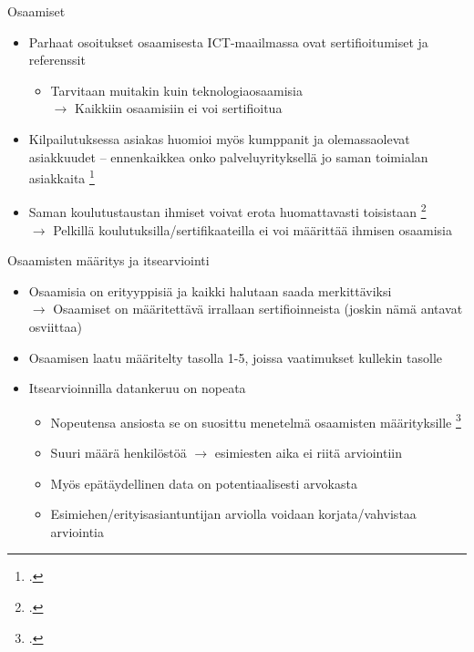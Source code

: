 \documentclass[first=purple,second=dblue,logo=redquo]{aaltoslides}
\begin{document}
\begin{frame}{Osaamiset}
\begin{itemize}
\item Parhaat osoitukset osaamisesta ICT-maailmassa ovat sertifioitumiset ja referenssit
\begin{itemize}
\item Tarvitaan muitakin kuin teknologiaosaamisia \\ $\rightarrow$ Kaikkiin osaamisiin ei voi sertifioitua
\end{itemize}
\item Kilpailutuksessa asiakas huomioi myös kumppanit ja olemassaolevat asiakkuudet -- ennenkaikkea onko palveluyrityksellä jo saman toimialan asiakkaita \footcite{ICT-haasteet}
\item Saman koulutustaustan ihmiset voivat erota huomattavasti toisistaan \footcite{self-assessment_in_skill_measurement} \\ $\rightarrow$ Pelkillä koulutuksilla/sertifikaateilla ei voi määrittää ihmisen osaamisia
\end{itemize}
\end{frame}
\begin{frame}{Osaamisten määritys ja itsearviointi}
\begin{itemize}
\item Osaamisia on erityyppisiä ja kaikki halutaan saada merkittäviksi \\ $\rightarrow$ Osaamiset on määritettävä irrallaan sertifioinneista (joskin nämä antavat osviittaa)
\item Osaamisen laatu määritelty tasolla 1-5, joissa vaatimukset kullekin tasolle
\item Itsearvioinnilla datankeruu on nopeata
\begin{itemize}
\item Nopeutensa ansiosta se on suosittu menetelmä osaamisten määrityksille \footcite{self-assessment_in_skill_measurement}
\item Suuri määrä henkilöstöä $\rightarrow$ esimiesten aika ei riitä arviointiin
\item Myös epätäydellinen data on potentiaalisesti arvokasta
\item Esimiehen/erityisasiantuntijan arviolla voidaan korjata/vahvistaa arviointia
\end{itemize}
\end{itemize}
\end{frame}
\end{document}
